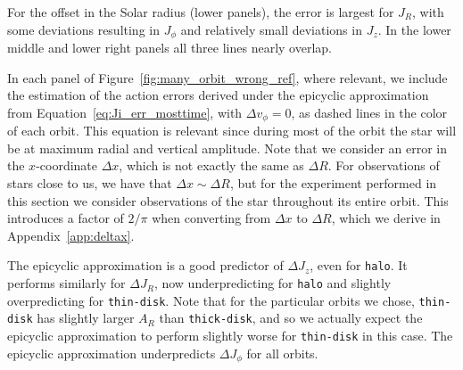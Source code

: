 \documentclass[twocolumn]{aastex62}
\newcommand{\thin}{\texttt{thin-disk}}
\newcommand{\thick}{\texttt{thick-disk}}
\newcommand{\halo}{\texttt{halo}}
\begin{document}
For the offset in the Solar radius (lower panels), the error is largest for
$J_R$, with some deviations resulting in $J_{\phi}$ and relatively small
deviations in $J_z$. In the lower middle and lower right panels all three
lines nearly overlap.

In each panel of Figure~\ref{fig:many_orbit_wrong_ref}, where relevant, we
include the estimation of the action errors derived under the epicyclic
approximation from Equation~\eqref{eq:Ji_err_mosttime}, with $\Delta
v_{\phi}=0$, as dashed lines in the color of each orbit. This equation is
relevant since during most of the orbit the star will be at maximum radial and
vertical amplitude. Note that we
consider an error in the $x$-coordinate $\Delta x$, which is not exactly the
same as $\Delta R$. For observations of stars close to us, we have that
$\Delta x \sim \Delta R$, but for the experiment performed in this section we
consider observations of the star throughout its entire orbit. This introduces
a factor of $2/\pi$ when converting from $\Delta x$ to $\Delta R$, which we
derive in Appendix~\ref{app:deltax}.

The epicyclic approximation is a good predictor of $\Delta J_z$, even for \halo{}.
It performs similarly for $\Delta J_R$, now underpredicting for \halo{}
and slightly overpredicting for \thin{}. Note that for the
particular orbits we chose, \thin{} has slightly larger $A_R$ than
\thick{}, and so we actually expect the epicyclic approximation to perform
slightly worse for \thin{} in this case. The epicyclic approximation underpredicts $\Delta J_{\phi}$
for all orbits.
\end{document}
